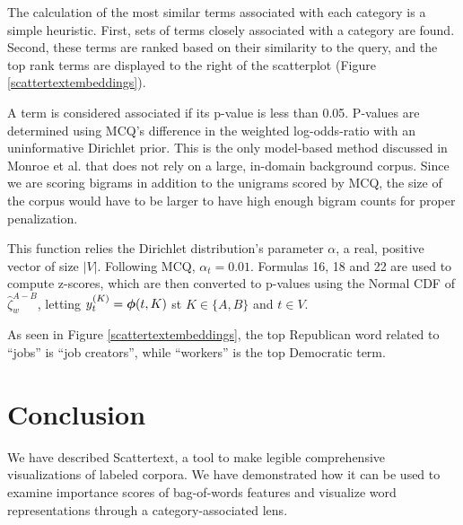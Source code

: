 \documentclass[11pt,a4paper]{article}
\begin{document}
The calculation of the most similar terms associated with each category is a simple heuristic.  First, sets of terms closely associated with a category are found. Second, these terms are ranked based on their similarity to the query, and the top rank terms are displayed to the right of the scatterplot (Figure \ref{scattertextembeddings}).  

A term is considered associated if its p-value is less than 0.05.  P-values are determined using MCQ's difference in the weighted log-odds-ratio with an uninformative Dirichlet prior.  This is the only model-based method discussed in Monroe et al. that does not rely on a large, in-domain background corpus. Since we are scoring bigrams in addition to the unigrams scored by MCQ, the size of the corpus would have to be larger to have high enough bigram counts for proper penalization.

This function relies the Dirichlet distribution's parameter $\alpha$, a real, positive vector of size $|V|$. Following MCQ, $\alpha_t = 0.01$.  Formulas 16, 18 and 22 are used to compute z-scores, which are then converted to p-values using the Normal CDF of $\hat{\zeta}_{w}^{A-B}$, letting $y^{(K)}_{t} = \mbox{\boldmath$\phi$}(t,K)$ st ${K}\in{\{A,B\}}$ and $t\in{V}$.

As seen in Figure \ref{scattertextembeddings}, the top Republican word related to ``jobs'' is ``job creators'', while ``workers'' is the top Democratic term.
\section{Conclusion}
We have described Scattertext, a tool to make legible comprehensive visualizations of labeled corpora.  We have demonstrated how it can be used to examine importance scores of bag-of-words features and visualize word representations through a category-associated lens. 
\vspace{-.5cm}


\end{document}
